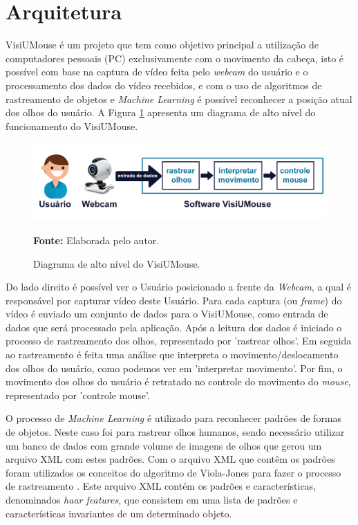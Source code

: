 \section{Arquitetura}\label{Sub:funcionamento-visiumouse}
VisiUMouse é um projeto que tem como objetivo principal a utilização de computadores pessoais (PC) exclusivamente com o movimento da cabeça, isto é possível com base na captura de vídeo feita pelo \textit{webcam} do usuário e o processamento dos dados do vídeo recebidos, e com o uso de algoritmos de rastreamento de objetos e \textit{Machine Learning} é possível reconhecer a posição atual dos olhos do usuário. A Figura \ref{fig:projeto-diagrama-alto-nivel} apresenta um diagrama de alto nível do funcionamento do VisiUMouse. 

\begin{figure}[H]
\centering
\caption{Diagrama de alto nível do VisiUMouse.}
\includegraphics[scale=.23]{img/projeto-diagrama-alto-nivel.png}

{\fontsize{11}{11}\selectfont \textbf{Fonte:} Elaborada pelo autor.}
\label{fig:projeto-diagrama-alto-nivel}
\end{figure}


Do lado direito é possível ver o Usuário posicionado a frente da \textit{Webcam}, a qual é responsável por capturar vídeo deste Usuário. Para cada captura (ou \textit{frame}) do vídeo é enviado um conjunto de dados para o VisiUMouse, como entrada de dados que será processado pela aplicação. Após a leitura dos dados é iniciado o processo de rastreamento dos olhos, representado por 'rastrear olhos'. Em seguida ao rastreamento é feita uma análise que interpreta o movimento/deslocamento dos olhos do usuário, como podemos ver em 'interpretar movimento'. Por fim, o movimento dos olhos do usuário é retratado no controle do movimento do \textit{mouse}, representado por 'controle mouse'.


O processo de \textit{Machine Learning} é utilizado para reconhecer padrões de formas de objetos. Neste caso foi para rastrear olhos humanos, sendo  necessário utilizar um banco de dados com grande volume de imagens de olhos que gerou um arquivo XML com estes padrões. Com o arquivo XML que contêm os padrões foram utilizados os conceitos do algoritmo de Viola-Jones para fazer o processo de rastreamento \cite{viola2001rapid}. Este arquivo XML contém os padrões e características, denominados \textit{haar features}, que consistem em uma lista de padrões e características invariantes de um determinado objeto.

